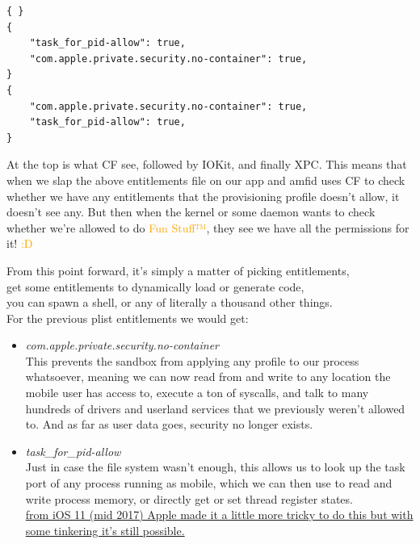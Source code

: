 \documentclass{beamer}
\begin{document}
\begin{frame}[fragile]
\begin{flushleft}
\begin{verbatim}
{ }
{
    "task_for_pid-allow": true,
    "com.apple.private.security.no-container": true,
}
{
    "com.apple.private.security.no-container": true,
    "task_for_pid-allow": true,
}
\end{verbatim}
\vfill
At the top is what CF see, followed by IOKit, and finally XPC.
\vfill
This means that when we slap the above entitlements file on our app and amfid uses CF to check whether we have any entitlements that the provisioning profile doesn’t allow, it doesn’t see any.
\vfill
But then when the kernel or some daemon wants to check whether we’re allowed to do \textcolor{orange}{Fun Stuff™}, they see we have all the permissions for it! \textcolor{orange}{:D}
\end{flushleft}
\end{frame}

\begin{frame}[fragile]
\begin{flushleft}
From this point forward, it’s simply a matter of picking entitlements,\\ get some entitlements to dynamically load or generate code,\\you can spawn a shell, or any of literally a thousand other things.\\\vfill
For the previous plist entitlements we would get:
\end{flushleft}
\begin{itemize}\small
    \item \emph{com.apple.private.security.no-container}\\This prevents the sandbox from applying any profile to our process whatsoever, meaning we can now read from and write to any location the mobile user has access to, execute a ton of syscalls, and talk to many hundreds of drivers and userland services that we previously weren’t allowed to. And as far as user data goes, security no longer exists.
\vfill
    \item \emph{task\_for\_pid-allow}\\Just in case the file system wasn’t enough, this allows us to look up the task port of any process running as mobile, which we can then use to read and write process memory, or directly get or set thread register states.\\
    \vspace{1mm}
    \tiny\href{https://siguza.github.io/psychicpaper/#4-escaping-the-sandbox}{from iOS 11 (mid 2017) Apple made it a little more tricky to do this but with some tinkering it's still possible.}
\end{itemize}

\end{frame}
\end{document}
